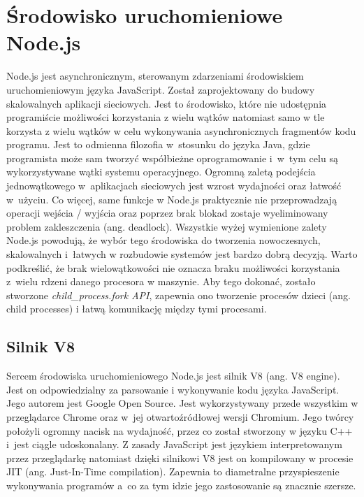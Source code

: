 \documentclass[../Kamil_Kowalewski_Main.tex]{subfiles}
\begin{document}
{    \section{Środowisko uruchomieniowe Node.js}
    \label{chapter3:technologie:node} {
        Node.js\cite{website:nodejs} jest asynchronicznym, sterowanym zdarzeniami
        środowiskiem uruchomieniowym języka JavaScript. Został zaprojektowany do budowy
        skalowalnych aplikacji sieciowych. Jest to środowisko, które nie udostępnia
        programiście możliwości korzystania z wielu wątków natomiast samo w tle
        korzysta z wielu wątków w celu wykonywania asynchronicznych fragmentów kodu
        programu. Jest to odmienna filozofia w~stosunku do języka Java, gdzie
        programista może sam tworzyć współbieżne oprogramowanie i~w~tym celu są
        wykorzystywane wątki systemu operacyjnego. Ogromną zaletą podejścia
        jednowątkowego w~aplikacjach sieciowych jest wzrost wydajności oraz
        łatwość w~użyciu. Co więcej, same funkcje w Node.js praktycznie nie
        przeprowadzają operacji wejścia / wyjścia oraz poprzez brak blokad zostaje
        wyeliminowany problem zakleszczenia (ang. deadlock). Wszystkie wyżej wymienione
        zalety Node.js powodują, że wybór tego środowiska do tworzenia nowoczesnych, skalowalnych
        i~łatwych w rozbudowie systemów jest bardzo dobrą decyzją. Warto podkreślić,
        że brak wielowątkowości nie oznacza braku możliwości korzystania z~wielu
        rdzeni danego procesora w maszynie. Aby tego dokonać, zostało
        stworzone \textit{child\_process.fork API}, zapewnia ono tworzenie procesów
        dzieci (ang. child processes) i łatwą komunikację między tymi procesami.

        \subsection{Silnik V8}
        \label{chapter3:technologie:node:v8} {
            Sercem środowiska uruchomieniowego Node.js jest silnik V8\cite{website:v8engine}
            (ang. V8 engine). Jest on odpowiedzialny za parsowanie i wykonywanie
            kodu języka JavaScript. Jego autorem jest Google Open Source. Jest
            wykorzystywany przede wszystkim w przeglądarce Chrome\cite{website:chrome}
            oraz w~jej otwartoźródłowej wersji Chromium\cite{website:chromium}. Jego
            twórcy położyli ogromny nacisk na wydajność, przez co został stworzony w
            języku C++ i~jest ciągle udoskonalany. Z zasady JavaScript jest językiem
            interpretowanym przez przeglądarkę natomiast dzięki silnikowi V8 jest on
            kompilowany w procesie JIT (ang. Just-In-Time compilation). Zapewnia to
            diametralne przyspieszenie wykonywania programów a~co za tym idzie jego
            zastosowanie są znacznie szersze.
        }

}}
\end{document}

